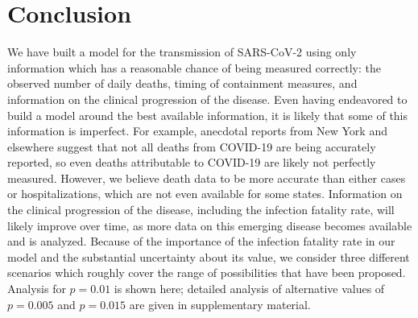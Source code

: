 \documentclass[11pt]{article}
\theoremstyle{plain}
\newcommand{\1}{\mathbf 1}
\begin{document}
\section{Conclusion}



We have built a model for the transmission of SARS-CoV-2 using only information which has a reasonable chance of being measured correctly:  the observed number of daily deaths, timing of containment measures, and information on the clinical progression of the disease. Even having endeavored to build a model around the best available information, it is likely that some of this information is imperfect. For example, anecdotal reports from New York and elsewhere suggest that not all deaths from COVID-19 are being accurately reported, so even deaths attributable to COVID-19 are likely not perfectly measured. However, we believe death data to be more accurate than either cases or hospitalizations, which are not even available for some states. Information on the clinical progression of the disease, including the infection fatality rate, will likely improve over time, as more data on this emerging disease becomes available and is analyzed. Because of the importance of the infection fatality rate in our model and the substantial uncertainty about its value, we consider three different scenarios which roughly cover the range of possibilities that have been proposed. Analysis for $p = 0.01$ is shown here; detailed analysis of alternative values of $p=0.005$ and $p=0.015$ are given in supplementary material. 
\end{document}
